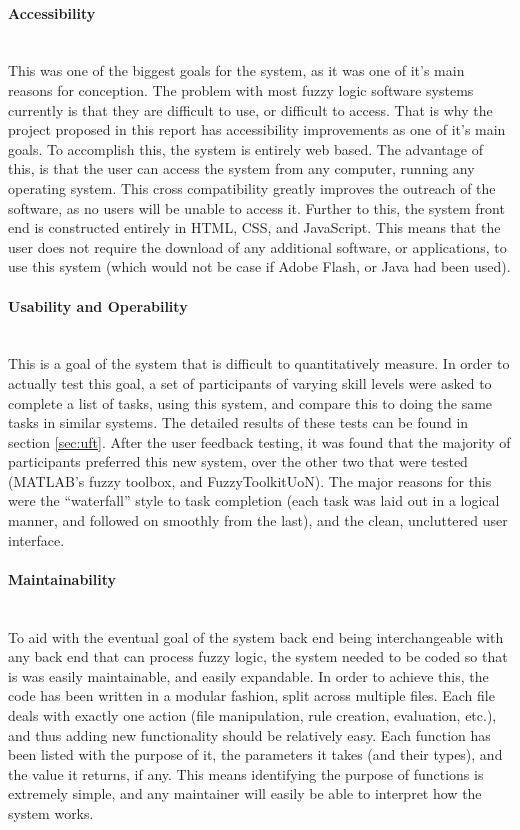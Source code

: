 \paragraph{Accessibility}\ \\
This was one of the biggest goals for the system, as it was one of it's main reasons for conception. The problem with most fuzzy logic software systems currently is that they are difficult to use, or difficult to access. That is why the project proposed in this report has accessibility improvements as one of it's main goals. To accomplish this, the system is entirely web based. The advantage of this, is that the user can access the system from any computer, running any operating system. This cross compatibility greatly improves the outreach of the software, as no users will be unable to access it. Further to this, the system front end is constructed entirely in HTML, CSS, and JavaScript. This means that the user does not require the download of any additional software, or applications, to use this system (which would not be case if Adobe Flash, or Java had been used). 

\paragraph{Usability and Operability}\ \\
This is a goal of the system that is difficult to quantitatively measure. In order to actually test this goal, a set of participants of varying skill levels were asked to complete a list of tasks, using this system, and compare this to doing the same tasks in similar systems. The detailed results of these tests can be found in section \ref{sec:uft}. After the user feedback testing, it was found that the majority of participants preferred this new system, over the other two that were tested (MATLAB's fuzzy toolbox, and FuzzyToolkitUoN). The major reasons for this were the ``waterfall'' style to task completion (each task was laid out in a logical manner, and followed on smoothly from the last), and the clean, uncluttered user interface. 

\paragraph{Maintainability}\ \\
To aid with the eventual goal of the system back end being interchangeable with any back end that can process fuzzy logic, the system needed to be coded so that is was easily maintainable, and easily expandable. In order to achieve this, the code has been written in a modular fashion, split across multiple files. Each file deals with exactly one action (file manipulation, rule creation, evaluation, etc.), and thus adding new functionality should be relatively easy. Each function has been listed with the purpose of it, the parameters it takes (and their types), and the value it returns, if any. This means identifying the purpose of functions is extremely simple, and any maintainer will easily be able to interpret how the system works. 

